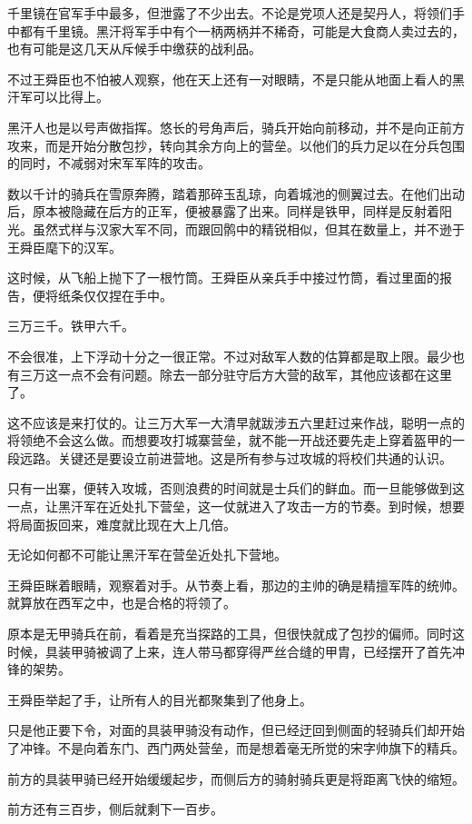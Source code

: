 千里镜在官军手中最多，但泄露了不少出去。不论是党项人还是契丹人，将领们手中都有千里镜。黑汗将军手中有个一柄两柄并不稀奇，可能是大食商人卖过去的，也有可能是这几天从斥候手中缴获的战利品。

不过王舜臣也不怕被人观察，他在天上还有一对眼睛，不是只能从地面上看人的黑汗军可以比得上。

黑汗人也是以号声做指挥。悠长的号角声后，骑兵开始向前移动，并不是向正前方攻来，而是开始分散包抄，转向其余方向上的营垒。以他们的兵力足以在分兵包围的同时，不减弱对宋军军阵的攻击。

数以千计的骑兵在雪原奔腾，踏着那碎玉乱琼，向着城池的侧翼过去。在他们出动后，原本被隐藏在后方的正军，便被暴露了出来。同样是铁甲，同样是反射着阳光。虽然式样与汉家大军不同，而跟回鹘中的精锐相似，但其在数量上，并不逊于王舜臣麾下的汉军。

这时候，从飞船上抛下了一根竹筒。王舜臣从亲兵手中接过竹筒，看过里面的报告，便将纸条仅仅捏在手中。

三万三千。铁甲六千。

不会很准，上下浮动十分之一很正常。不过对敌军人数的估算都是取上限。最少也有三万这一点不会有问题。除去一部分驻守后方大营的敌军，其他应该都在这里了。

这不应该是来打仗的。让三万大军一大清早就跋涉五六里赶过来作战，聪明一点的将领绝不会这么做。而想要攻打城寨营垒，就不能一开战还要先走上穿着盔甲的一段远路。关键还是要设立前进营地。这是所有参与过攻城的将校们共通的认识。

只有一出寨，便转入攻城，否则浪费的时间就是士兵们的鲜血。而一旦能够做到这一点，让黑汗军在近处扎下营垒，这一仗就进入了攻击一方的节奏。到时候，想要将局面扳回来，难度就比现在大上几倍。

无论如何都不可能让黑汗军在营垒近处扎下营地。

王舜臣眯着眼睛，观察着对手。从节奏上看，那边的主帅的确是精擅军阵的统帅。就算放在西军之中，也是合格的将领了。

原本是无甲骑兵在前，看着是充当探路的工具，但很快就成了包抄的偏师。同时这时候，具装甲骑被调了上来，连人带马都穿得严丝合缝的甲胄，已经摆开了首先冲锋的架势。

王舜臣举起了手，让所有人的目光都聚集到了他身上。

只是他正要下令，对面的具装甲骑没有动作，但已经迂回到侧面的轻骑兵们却开始了冲锋。不是向着东门、西门两处营垒，而是想着毫无所觉的宋字帅旗下的精兵。

前方的具装甲骑已经开始缓缓起步，而侧后方的骑射骑兵更是将距离飞快的缩短。

前方还有三百步，侧后就剩下一百步。


